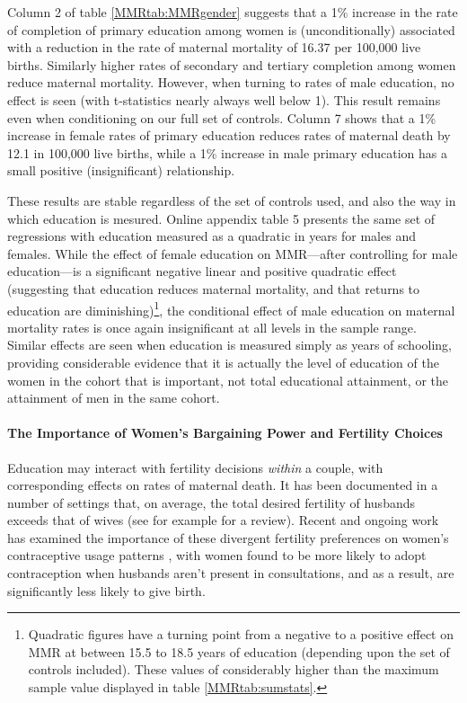 \documentclass{article}[12pt,subeqn]
\begin{document}
\begin{spacing}{1.4}
Column 2 of table \ref{MMRtab:MMRgender} suggests that a 1\% increase in the
rate of completion of primary education among women is (unconditionally) 
associated with a reduction in the rate of maternal mortality of 16.37 per 
100,000 live births.  Similarly higher rates of secondary and tertiary 
completion among women reduce maternal mortality.  However, when turning to 
rates of male education, no effect is seen (with t-statistics nearly always
well below 1).  This result remains even when conditioning on our full set
of controls.  Column 7 shows that a 1\% increase in female rates of primary
education reduces rates of maternal death by 12.1 in 100,000 live births,
while a 1\% increase in male primary education has a small positive
(insignificant) relationship.

These results are stable regardless of the set of controls used, and also the
way in which education is mesured.  Online appendix table 5 presents the same
set of regressions with education measured as a quadratic in years for males
and females.  While the effect of female education on MMR---after controlling
for male education---is a significant negative linear and positive quadratic
effect (suggesting that education reduces maternal mortality, and that returns
to education are diminishing)\footnote{Quadratic figures have a turning point
  from a negative to a positive effect on MMR at between 15.5 to 18.5 years of
  education (depending upon the set of controls included).  These values of
  considerably higher than the maximum sample value displayed in table
  \ref{MMRtab:sumstats}.}, the conditional effect of male education on maternal
mortality rates is once again insignificant at all levels in the sample range.
Similar effects are seen when education is measured simply as years of schooling,
providing considerable evidence that it is actually the level of education of
the women in the cohort that is important, not total educational attainment, or
the attainment of men in the same cohort.

\paragraph{The Importance of Women's Bargaining Power and Fertility Choices}
Education may interact with fertility decisions \emph{within} a couple, with
corresponding effects on rates of maternal death.  It has been documented in
a number of settings that, on average, the total desired fertility of
husbands exceeds that of wives (see for example \citet{UN2001} for a review).
Recent and ongoing work has examined the importance of these divergent
fertility preferences on women's contraceptive usage patterns
\citep{Ashrafetal2014}, with women found to be more likely to adopt
contraception when husbands aren't present in consultations, and as a
result, are significantly less likely to give birth.


\end{spacing}
\end{document}
